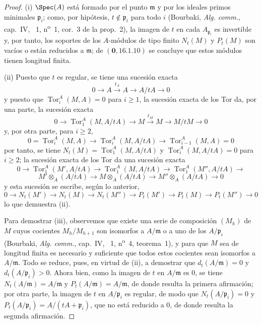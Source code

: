 \begin{proof}
(i) $\Spec(A)$ está formado por el punto $\mathfrak{m}$ y por los ideales primos minimales $\mathfrak{p}_i$;
como, por hipótesis, $t\notin\mathfrak{p}_i$ para todo $i$ (Bourbaki, \emph{Alg. comm.}, cap.~IV, \textsection~1, n\textsuperscript{o}~1, cor.~3 de la prop.~2), la imagen de $t$ en cada $A_{\mathfrak{p}_i}$ es invertible y, por tanto, los soportes de los $A$-módulos de tipo finito $N_t(M)$ y $P_t(M)$ son vacíos o están reducidos a $\mathfrak{m}$;
de $(\mathbf{0},16.1.10)$ se concluye que estos módulos tienen longitud finita.

(ii) Puesto que $t$ es regular, se tiene una sucesión exacta
\[
  0\to A\xrightarrow{t_A}A\to A/tA\to0
\]
y puesto que $\operatorname{Tor}_i^A(M,A)=0$ para $i\geq1$, la sucesión exacta de los Tor da, por una parte, la sucesión exacta
\[
  0\to\operatorname{Tor}_1^A(M,A/tA)\to M\xrightarrow{t_M}M\to M/tM\to0
\]
y, por otra parte, para $i\geq2$,
\[
  0=\operatorname{Tor}_i^A(M,A)\to\operatorname{Tor}_i^A(M,A/tA)\to\operatorname{Tor}_{i-1}^A(M,A)=0
\]
por tanto, se tiene $N_t(M)=\operatorname{Tor}_1^A(M,A/tA)$ y $\operatorname{Tor}_i^A(M,A/tA)=0$ para $i\geq2$;
la sucesión exacta de los Tor da una sucesión exacta
\[
  0\to\operatorname{Tor}_1^A(M',A/tA)\to\operatorname{Tor}_1^A(M,A/tA)\to\operatorname{Tor}_1^A(M'',A/tA)\to
\]
\[
  M'\otimes_A(A/tA)\to M\otimes_A(A/tA)\to M''\otimes_A(A/tA)\to0
\]
y esta sucesión se escribe, según lo anterior,
\[
  0\to N_t(M')\to N_t(M)\to N_t(M'')\to P_t(M')\to P_t(M)\to P_t(M'')\to0
\]
lo que demuestra (ii).

Para demostrar (iii), observemos que existe una serie de composición $(M_h)$ de $M$ cuyos cocientes $M_h/M_{h+1}$ son isomorfos a $A/\mathfrak{m}$ o a uno de los $A/\mathfrak{p}_i$ (Bourbaki, \emph{Alg. comm.}, cap.~IV, \textsection~1, n\textsuperscript{o}~4, teorema~1), y para que $M$ sea de longitud finita es necesario y suficiente que todos estos cocientes sean isomorfos a $A/\mathfrak{m}$.
Todo se reduce, pues, en virtud de (ii), a demostrar que $d_t(A/\mathfrak{m})=0$ y $d_t(A/\mathfrak{p}_i)>0$.
Ahora bien, como la imagen de $t$ en $A/\mathfrak{m}$ es $0$, se tiene $N_t(A/\mathfrak{m})=A/\mathfrak{m}$ y $P_t(A/\mathfrak{m})=A/\mathfrak{m}$, de donde resulta la primera afirmación;
por otra parte, la imagen de $t$ en $A/\mathfrak{p}_i$ es regular, de modo que $N_t(A/\mathfrak{p}_i)=0$ y $P_t(A/\mathfrak{p}_i)=A/(tA+\mathfrak{p}_i)$, que no está reducido a $0$, de donde resulta la segunda afirmación.


\end{proof}
